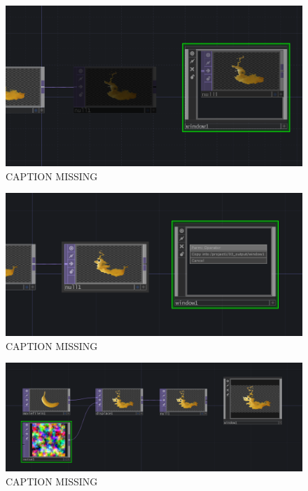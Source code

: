 \begin{figure}[H]
	\centering
	\includegraphics[width=\textwidth]{img/dragOnWindow.PNG}
	\caption[shortCaption]
	{CAPTION MISSING}
	\label{fig:label}
\end{figure}

\begin{figure}[H]
	\centering
	\includegraphics[width=\textwidth]{img/dragMenu.PNG}
	\caption[shortCaption]
	{CAPTION MISSING}
	\label{fig:label}
\end{figure}

\begin{figure}[H]
	\centering
	\includegraphics[width=\textwidth]{img/outputToWindow.PNG}
	\caption[shortCaption]
	{CAPTION MISSING}
	\label{fig:label}
\end{figure}




